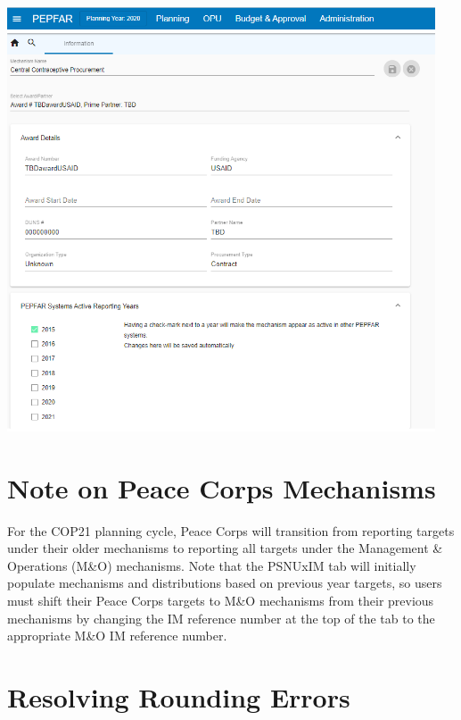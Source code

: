 \documentclass[
  openany]{book}
\begin{document}
\begin{center}

\includegraphics[width=5in]{./images/image15.png}

\end{center}

\hypertarget{note-on-peace-corps-mechanisms}{%
\section{Note on Peace Corps Mechanisms}\label{note-on-peace-corps-mechanisms}}

For the COP21 planning cycle, Peace Corps will transition from reporting
targets under their older mechanisms to reporting all targets under the
Management \& Operations (M\&O) mechanisms. Note that the PSNUxIM tab will
initially populate mechanisms and distributions based on previous year targets,
so users must shift their Peace Corps targets to M\&O mechanisms from their
previous mechanisms by changing the IM reference number at the top of the tab
to the appropriate M\&O IM reference number.

\hypertarget{resolving-rounding-errors}{%
\section{Resolving Rounding Errors}\label{resolving-rounding-errors}}
\end{document}
